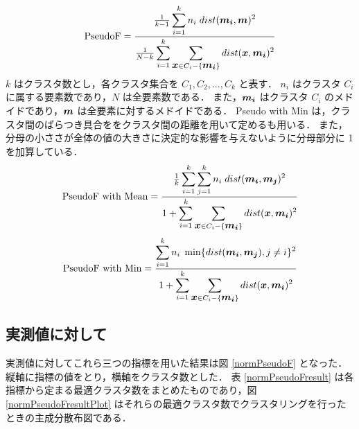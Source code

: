 \documentclass[a4j]{jarticle}
\begin{document}
\begin{equation}
\textrm{PseudoF} = \frac{\frac{1}{k-1} \displaystyle \sum^k_{i=1} n_{i}\hspace{0.1cm} dist(\mbox{\boldmath $m_{i}$},\mbox{\boldmath $m$})^2}{\frac{1}{N-k} \displaystyle \sum^k_{i=1}\displaystyle \sum_{\mbox{\boldmath $x$} \in C_i - \{\mbox{\boldmath $m_i$}\}} dist(\mbox{\boldmath $x$},\mbox{\boldmath $m_{i}$})^2}
\label{PseudoF}
\end{equation}
$k$ はクラスタ数とし，各クラスタ集合を $C_1,C_2,...,C_k$ と表す．
$n_i$ はクラスタ $C_i$ に属する要素数であり，$N$ は全要素数である．
また，$\mbox{\boldmath $m_i$}$ はクラスタ $C_i$ のメドイドであり，$\mbox{\boldmath $m$}$ は全要素に対するメドイドである．
Pseudo with Min は，クラスタ間のばらつき具合ををクラスタ間の距離を用いて定めるも用いる．
また，分母の小ささが全体の値の大きさに決定的な影響を与えないように分母部分に 1 を加算している．
\begin{equation}
\textrm{PseudoF with Mean} = \frac{\frac{1}{k} \displaystyle \sum^k_{i=1}\displaystyle \sum^k_{j=1} n_{i}\hspace{0.1cm} dist(\mbox{\boldmath $m_{i}$},\mbox{\boldmath $m_j$})^2}{1 + \displaystyle \sum^k_{i=1}\displaystyle \sum_{\mbox{\boldmath $x$} \in C_i - \{\mbox{\boldmath $m_i$}\}} dist(\mbox{\boldmath $x$},\mbox{\boldmath $m_{i}$})^2}
\label{PseudoFwithMean}
\end{equation}
\begin{equation}
\textrm{PseudoF with Min} = \frac{ \displaystyle \sum^k_{i=1} n_{i}\hspace{0.1cm} \min \{ dist(\mbox{\boldmath $m_{i}$},\mbox{\boldmath $m_j$}),j \neq i \}^2}{1 + \displaystyle \sum^k_{i=1}\displaystyle \sum_{\mbox{\boldmath $x$} \in C_i - \{\mbox{\boldmath $m_i$}\}} dist(\mbox{\boldmath $x$},\mbox{\boldmath $m_{i}$})^2}
\label{PseudoFwithMin}
\end{equation}

\newpage
\subsection{実測値に対して}
実測値に対してこれら三つの指標を用いた結果は図 \ref{normPseudoF} となった．
縦軸に指標の値をとり，横軸をクラスタ数とした．
表 \ref{normPseudoFresult} は各指標から定まる最適クラスタ数をまとめたものであり，図 \ref{normPseudoFresultPlot} はそれらの最適クラスタ数でクラスタリングを行ったときの主成分散布図である．
\end{document}
